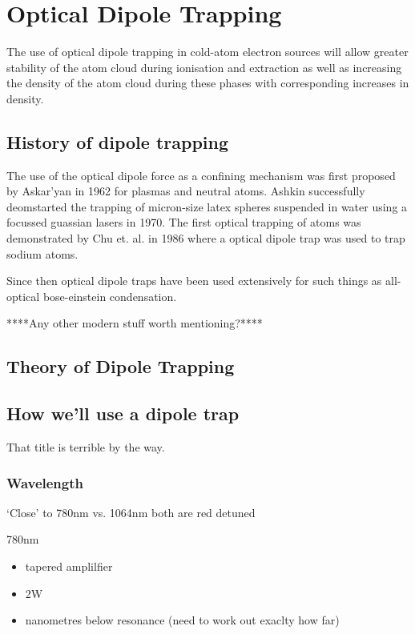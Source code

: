 \section{Optical Dipole Trapping}

The use of optical dipole trapping in cold-atom electron sources will allow greater stability of the atom cloud during ionisation and extraction as well as increasing the density of the atom cloud during these phases with corresponding increases in density.

\subsection{History of dipole trapping}
The use of the optical dipole force as a confining mechanism was first proposed by Askar'yan in 1962\cite{askaryan_effects_1962} for plasmas and neutral atoms. Ashkin successfully deomstarted the trapping of micron-size latex spheres suspended in water using a focussed guassian lasers in 1970\cite{ashkin_acceleration_1970}. The first optical trapping of atoms was demonstrated by Chu et. al. in 1986\cite{chu_experimental_1986} where a optical dipole trap was used to trap sodium atoms.

Since then optical dipole traps have been used extensively for such things as all-optical bose-einstein condensation\cite{barrett_all-optical_2001}.

****Any other modern stuff worth mentioning?****

\subsection{Theory of Dipole Trapping}



\subsection{How we'll use a dipole trap}
That title is terrible by the way.

\subsubsection{Wavelength}
`Close' to 780nm vs. 1064nm
both are red detuned

780nm
\begin{itemize}
    \item tapered amplilfier
    \item 2W
    \item nanometres below resonance (need to work out exaclty how far)
\end{itemize}

